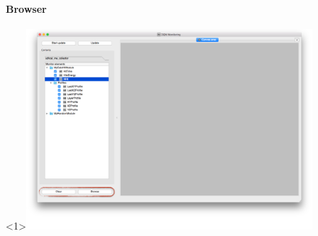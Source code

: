 \documentclass[8pt]{beamer}
\begin{document}
  
 \begin{frame}
    \frametitle{\secname}
    \framesubtitle{ Browser }
    
    \begin{overlayarea}{\textwidth}{\textheight}
    	       \begin{center}

        \begin{onlyenv}<1>\includegraphics[width=0.8\textwidth]{figs/MonitoringGui/MG_Browse.png}\end{onlyenv}
                       \end{center}

       \begin{columns}
       
	 \vspace{-2em}


\end{columns}
\end{overlayarea}
\end{frame}
\end{document}

